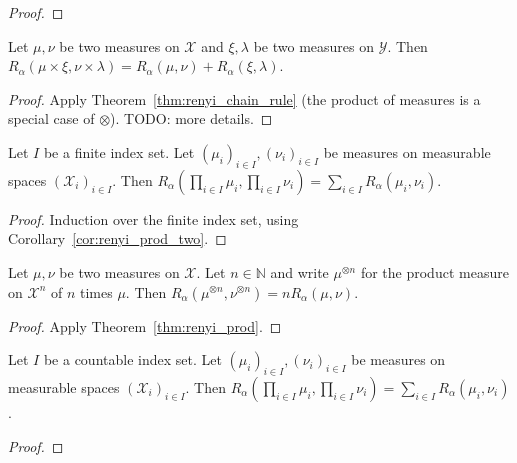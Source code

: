 \begin{proof}
\end{proof}

\begin{corollary}
  \label{cor:renyi_prod_two}
  Let $\mu, \nu$ be two measures on $\mathcal X$ and $\xi, \lambda$ be two measures on $\mathcal Y$.
  Then $R_\alpha(\mu \times \xi, \nu \times \lambda) = R_\alpha(\mu, \nu) + R_\alpha(\xi, \lambda)$.
\end{corollary}

\begin{proof}
Apply Theorem~\ref{thm:renyi_chain_rule} (the product of measures is a special case of $\otimes$). TODO: more details.
\end{proof}

\begin{theorem}
  \label{thm:renyi_prod}
  Let $I$ be a finite index set. Let $(\mu_i)_{i \in I}, (\nu_i)_{i \in I}$ be measures on measurable spaces $(\mathcal X_i)_{i \in I}$.
  Then $R_\alpha (\prod_{i \in I} \mu_i, \prod_{i \in I} \nu_i) = \sum_{i \in I} R_\alpha(\mu_i, \nu_i)$.
\end{theorem}

\begin{proof}
Induction over the finite index set, using Corollary~\ref{cor:renyi_prod_two}.
\end{proof}

\begin{corollary}
  \label{lem:renyi_prod_n}
  Let $\mu, \nu$ be two measures on $\mathcal X$. Let $n \in \mathbb{N}$ and write $\mu^{\otimes n}$ for the product measure on $\mathcal X^n$ of $n$ times $\mu$.
  Then $R_\alpha(\mu^{\otimes n}, \nu^{\otimes n}) = n R_\alpha(\mu, \nu)$.
\end{corollary}

\begin{proof}
Apply Theorem~\ref{thm:renyi_prod}.
\end{proof}

\begin{theorem}
  \label{thm:renyi_prod_countable}
  Let $I$ be a countable index set. Let $(\mu_i)_{i \in I}, (\nu_i)_{i \in I}$ be measures on measurable spaces $(\mathcal X_i)_{i \in I}$.
  Then $R_\alpha (\prod_{i \in I} \mu_i, \prod_{i \in I} \nu_i) = \sum_{i \in I} R_\alpha(\mu_i, \nu_i)$.
\end{theorem}

\begin{proof}
\end{proof}
